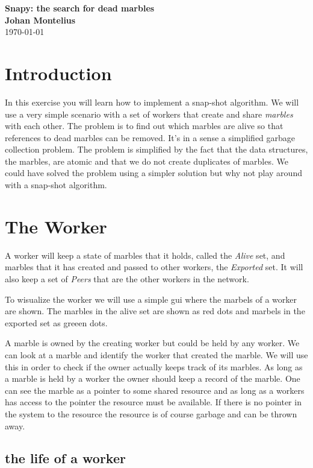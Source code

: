\documentclass[a4paper,11pt]{article}
\newcommand{\nnsection}[1]{
\section*{#1}
\addcontentsline{toc}{section}{#1}
}
\begin{document}
\begin{center}
\vspace{20pt}
\textbf{\large Snapy: the search for dead marbles}\\
\vspace{10pt}
\textbf{Johan Montelius}\\
\vspace{10pt}
\today{}
\end{center}

\nnsection{Introduction}

In this exercise you will learn how to implement a snap-shot
algorithm. We will use a very simple scenario with a set of workers
that create and share {\it marbles} with each other. The problem is to
find out which marbles are alive so that references to dead marbles can
be removed. It's in a sense a simplified garbage collection
problem. The problem is simplified by the fact that the data
structures, the marbles, are atomic and that we do not create
duplicates of marbles. We could have solved the problem using a
simpler solution but why not play around with a snap-shot algorithm.


\section{The Worker}

A worker will keep a state of marbles that it holds, called the {\it
  Alive} set, and marbles that it has created and passed to other
workers, the {\it Exported} set. It will also keep a set of {\it
  Peers} that are the other workers in the network.

To wisualize the worker we will use a simple gui where the marbels of
a worker are shown. The marbles in the alive set are shown as red dots
and marbels in the exported set as greeen dots. 

A marble is owned by the creating worker but could be held by any
worker. We can look at a marble and identify the worker that created
the marble. We will use this in order to check if the owner actually
keeps track of its marbles. As long as a marble is held by a worker
the owner should keep a record of the marble. One can see the marble
as a pointer to some shared resource and as long as a workers has
access to the pointer the resource must be available. If there is no
pointer in the system to the resource the resource is of course
garbage and can be thrown away.

\subsection{the life of a worker}
\end{document}
